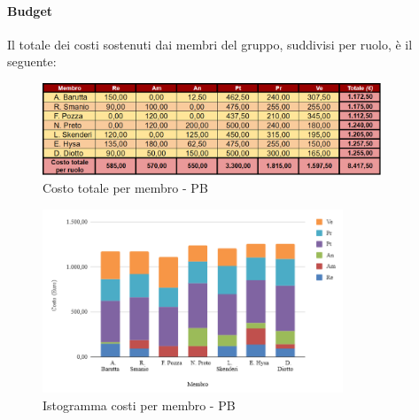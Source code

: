 \vspace{0.6cm}

\paragraph{Budget}
Il totale dei costi sostenuti dai membri del gruppo, suddivisi per ruolo, è il seguente:
\begin{figure}[H]
    \centering
    \includegraphics[width=0.9\textwidth]{../Images/RiepilogoPrezziPB.png}
    \caption{Costo totale per membro - PB}
    \label{fig:CostiPB}
\end{figure}
\begin{figure}[H]
    \centering
    \includegraphics[width=0.8\textwidth]{../Images/graficoCostoRuoloPB.png}
    \caption{Istogramma costi per membro - PB}
    \label{fig:GraficoCostoPB}
\end{figure}